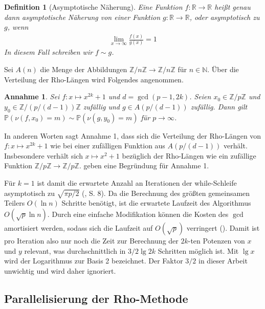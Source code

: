 \documentclass[a4paper, 10pt, ngerman]{article}
\newcommand{\N}{\mathbb{N}}
\newcommand{\R}{\mathbb{R}}
\newcommand{\Z}{\mathbb{Z}}
\renewcommand{\P}{\mathbb{P}}
\newtheorem{definition}{Definition}
\newtheorem{assumption}{Annahme}
\begin{document}
\begin{definition}[Asymptotische Näherung]
    Eine Funktion $f : \R \to \R$ heißt genau dann asymptotische Näherung von einer Funktion $g : \R \to \R$, oder asymptotisch zu $g$, wenn
    \begin{align*}
        \lim_{x \to \infty} \frac {f(x)} {g(x)} = 1
    \end{align*}
    In diesem Fall schreiben wir $f \sim g$.
\end{definition}

Sei $A(n)$ die Menge der Abbildungen $\Z/n\Z \to \Z/n\Z$ für $n \in \N$. Über die Verteilung der Rho-Längen wird Folgendes angenommen.

\begin{assumption}
    Sei $f : x \mapsto x^{2k} + 1$ und $d = \gcd(p - 1, 2k)$. Seien $x_0 \in \Z/p\Z$ und $y_0 \in \Z/(p/(d - 1))\Z$ zufällig und $g \in A(p/(d - 1))$ zufällig. Dann gilt $\P(\nu(f, x_0) = m) \sim \P(\nu(g, y_0) = m)$ für $p \to \infty$.
\end{assumption}

\noindent In anderen Worten sagt Annahme 1, dass sich die Verteilung der Rho-Längen von $f : x \mapsto x^{2k} + 1$ wie bei einer zufälligen Funktion aus $A(p/(d - 1))$ verhält. Insbesondere verhält sich $x \mapsto x^2 + 1$ bezüglich der Rho-Längen wie ein zufällige Funktion $\Z/p\Z \to \Z/p\Z$. \cite{bp81} geben eine Begründung für Annahme 1.

Für $k = 1$ ist damit die erwartete Anzahl an Iterationen der while-Schleife asymptotisch zu $\sqrt{\pi p / 2}$ (\cite{knu98}, S. 8). Da die Berechnung des größten gemeinsamen Teilers $O(\ln n)$ Schritte benötigt, ist die erwartete Laufzeit des Algorithmus $O(\sqrt p \ln n)$. Durch eine einfache Modifikation können die Kosten des $\gcd$ amortisiert werden, sodass sich die Laufzeit auf $O(\sqrt p)$ verringert (\cite{bre80}). Damit ist pro Iteration also nur noch die Zeit zur Berechnung der $2k$-ten Potenzen von $x$ und $y$ relevant, was durchschnittlich in $3/2 \lg 2k$ Schritten möglich ist. Mit $\lg x$ wird der Logarithmus zur Basis 2 bezeichnet. Der Faktor $3/2$ in dieser Arbeit unwichtig und wird daher ignoriert.

\subsection{Parallelisierung der Rho-Methode}\label{sec:par}
\end{document}
